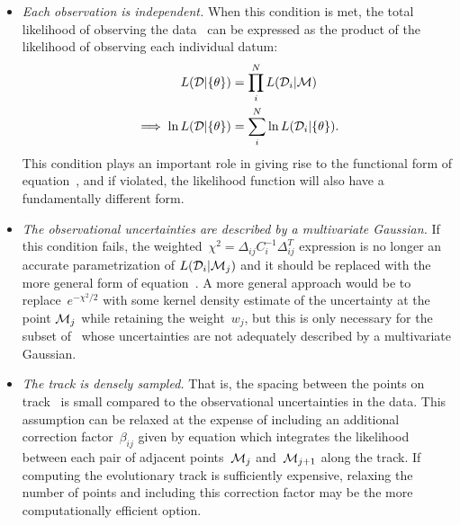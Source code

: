 \documentclass[ms.tex]{subfiles}
\begin{document}
\begin{itemize}
\begin{itemize}
		\item \textit{Each observation is independent.}
		When this condition is met, the total likelihood of observing the
		data~ can be expressed as the product of the likelihood of
		observing each individual datum:
		\begin{subequations}\begin{align}
		L(\mathcal{D} | \{\theta\}) &= \prod_i^N L(\mathcal{D}_i | \mathcal{M})
		\\
		\implies \ln L(\mathcal{D} | \{\theta\}) &= \sum_i^N \ln
		L(\mathcal{D}_i | \{\theta\}).
		\end{align}\end{subequations}
		This condition plays an important role in giving rise to the
		functional form of equation~, and if violated, the
		likelihood function will also have a fundamentally different form.

		\item \textit{The observational uncertainties are described by a
		multivariate Gaussian.}
		If this condition fails, the weighted~$\chi^2 = \Delta_{ij} C_i^{-1}
		\Delta_{ij}^T$ expression is no longer an accurate parametrization of
		$L(\mathcal{D}_i | \mathcal{M}_j)$ and it should be replaced with the
		more general form of equation~.
		A more general approach would be to replace~$e^{-\chi^2/2}$ with
		some kernel density estimate of the uncertainty at the point
		$\mathcal{M}_j$ while retaining the weight~$w_j$, but this is only
		necessary for the subset of~ whose uncertainties are not
		adequately described by a multivariate Gaussian.

		\item \textit{The track is densely sampled.}
		That is, the spacing between the points on track~ is small
		compared to the observational uncertainties in the data.
		This assumption can be relaxed at the expense of including an
		additional correction factor~$\beta_{ij}$ given by equation
		 which integrates the likelihood between each
		pair of adjacent points~$\mathcal{M}_j$ and~$\mathcal{M}_{j + 1}$ along
		the track.
		If computing the evolutionary track is sufficiently expensive,
		relaxing the number of points and including this correction factor may
		be the more computationally efficient option.


\end{itemize}
\end{itemize}
\end{document}
